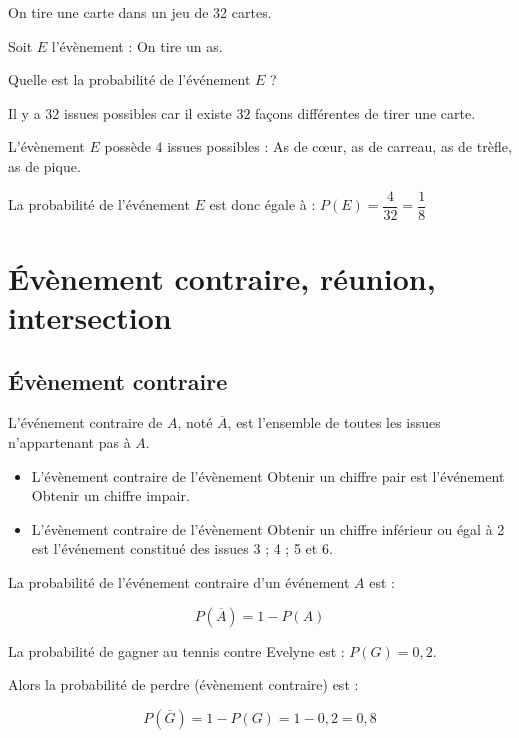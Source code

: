 \begin{methode}
	On tire une carte dans un jeu de 32 cartes.

	Soit $E$ l'évènement : \og{}On tire un as\fg{}.

	Quelle est la probabilité de l'événement $E$ ?
\end{methode}

\begin{correction}
	Il y a $32$ issues possibles car il existe $32$ façons différentes de tirer une carte.

	L'évènement $E$ possède $4$ issues possibles : As de cœur, as de carreau, as de trèfle, as de pique.

	La probabilité de l'événement $E$ est donc égale à : $P(E) = \dfrac{4}{32} = \dfrac{1}{8}$
\end{correction}

\section{Évènement contraire, réunion, intersection}
\subsection{Évènement contraire}
\begin{df}
	L'événement contraire de $A$, noté $\overline{A}$, est l'ensemble de toutes les issues n'appartenant pas à $A$.
\end{df}
\begin{exemple}
	\ajusteliste
	\begin{itemize}
		\item L'évènement contraire de l'évènement \og{}Obtenir un chiffre pair\fg{} est l'événement \og{}Obtenir un chiffre impair\fg{}.
		\item L'évènement contraire de l'évènement \og{}Obtenir un chiffre inférieur ou égal à 2\fg{} est l'événement constitué des issues 3 ; 4 ; 5 et 6.
	\end{itemize}
\end{exemple}
\begin{propriete}
	La probabilité de l'événement contraire d'un événement $A$ est :

	$$P(\overline{A}) = 1 - P(A)$$

\end{propriete}
\begin{exemple}
	La probabilité de gagner au tennis contre Evelyne est : $P(G) = 0,2$.

	Alors la probabilité de perdre (évènement contraire) est :

	$$P(\overline{G}) = 1 - P(G) = 1 - 0,2 = 0,8$$

\end{exemple}

